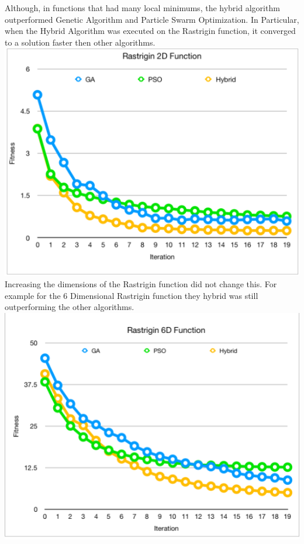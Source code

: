 \documentclass[twocolumn]{article}
\begin{document}
Although, in functions that had many local minimums, the hybrid algorithm outperformed Genetic Algorithm and Particle Swarm Optimization. In Particular, when the Hybrid Algorithm was executed on the Rastrigin function, it converged to a solution faster then other algorithms.
\\
\includegraphics[scale=0.43]{Images/Rastrigin2D.png} 
\\
Increasing the dimensions of the Rastrigin function did not change this. For example for the 6 Dimensional Rastrigin function they hybrid was still outperforming the other algorithms.
\\
\includegraphics[scale=0.43]{Images/Rastrigin.png} 
\end{document}
